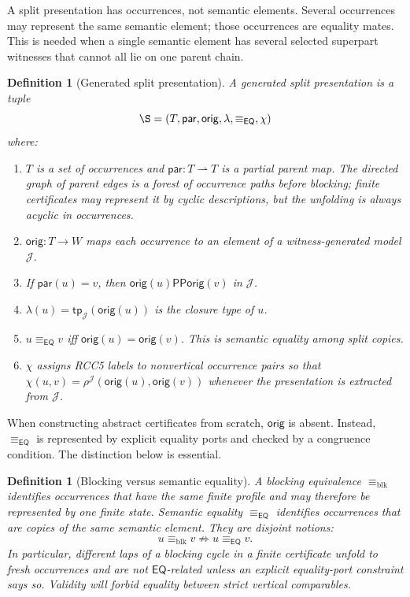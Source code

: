 \documentclass[11pt]{article}
\newtheorem{definition}[theorem]{Definition}
\newcommand{\EQ}{\mathsf{EQ}}
\newcommand{\PP}{\mathsf{PP}}
\newcommand{\J}{\mathcal J}
\newcommand{\parr}{\mathsf{par}}
\newcommand{\orig}{\mathsf{orig}}
\newcommand{\tp}{\mathsf{tp}}
\newcommand{\eqc}{\equiv_{\EQ}}
\newcommand{\blkeq}{\equiv_{\mathrm{blk}}}
\begin{document}
A split presentation has occurrences, not semantic elements.  Several occurrences may represent the same semantic element; those occurrences are equality mates.  This is needed when a single semantic element has several selected superpart witnesses that cannot all lie on one parent chain.

\begin{definition}[Generated split presentation]
A generated split presentation is a tuple
\[
  \S=(T,\parr,\orig,\lambda,\eqc,\chi)
\]
where:
\begin{enumerate}[label=(S\arabic*)]
\item $T$ is a set of occurrences and $\parr:T\rightharpoonup T$ is a partial parent map.  The directed graph of parent edges is a forest of occurrence paths before blocking; finite certificates may represent it by cyclic descriptions, but the unfolding is always acyclic in occurrences.
\item $\orig:T\to W$ maps each occurrence to an element of a witness-generated model $\J$.
\item If $\parr(u)=v$, then $\orig(u)\PP\orig(v)$ in $\J$.
\item $\lambda(u)=\tp_\J(\orig(u))$ is the closure type of $u$.
\item $u\eqc v$ iff $\orig(u)=\orig(v)$.  This is semantic equality among split copies.
\item $\chi$ assigns RCC5 labels to nonvertical occurrence pairs so that $\chi(u,v)=\rho^\J(\orig(u),\orig(v))$ whenever the presentation is extracted from $\J$.
\end{enumerate}
\end{definition}

When constructing abstract certificates from scratch, $\orig$ is absent.  Instead, $\eqc$ is represented by explicit equality ports and checked by a congruence condition.  The distinction below is essential.

\begin{definition}[Blocking versus semantic equality]
A blocking equivalence $\blkeq$ identifies occurrences that have the same finite profile and may therefore be represented by one finite state.  Semantic equality $\eqc$ identifies occurrences that are copies of the same semantic element.  They are disjoint notions:
\[
  u\blkeq v \not\Rightarrow u\eqc v.
\]
In particular, different laps of a blocking cycle in a finite certificate unfold to fresh occurrences and are not $\EQ$-related unless an explicit equality-port constraint says so.  Validity will forbid equality between strict vertical comparables.
\end{definition}
\end{document}
